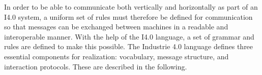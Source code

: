 In order to be able to communicate both vertically and horizontally as part of an I4.0 system, a uniform set of rules must therefore be defined for communication so that messages can be exchanged between machines in a readable and interoperable manner. With the help of the \ac{I4.0} language, a set of grammar and rules are defined to make this possible. The Industrie 4.0 language defines three essential components for realization: vocabulary, message structure, and interaction protocols. These are described in the following.

